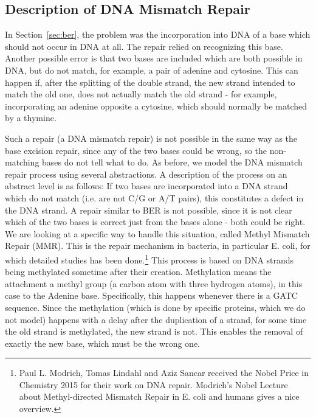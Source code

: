 
\subsection{Description of DNA Mismatch Repair}

In Section~\ref{sec:ber}, the problem was the incorporation into DNA of a base which should not occur in DNA at all. The repair relied on recognizing this base. Another possible error is that two bases are included which are both possible in DNA, but do not match, for example, a pair of adenine and cytosine. This can happen if, after the splitting of the double strand, the new strand intended to match the old one, does not actually match the old strand - for example, incorporating an adenine opposite a cytosine, which should normally be matched by a thymine.

Such a repair (a DNA mismatch repair) is not possible in the same way as the base excision repair, since any of the two bases could be wrong, so the non-matching  bases do not tell what to do. As before, we model the DNA mismatch repair process using several abstractions. A description of the process on an abstract level is as follows: If two bases are incorporated into a DNA strand which do not match (i.e. are not C/G or A/T pairs), this constitutes a defect in the DNA strand. A repair similar to BER is not possible, since it is not clear which of the two bases is correct just from the bases alone - both could be right. We are looking at a specific way to handle this situation, called Methyl Mismatch Repair (MMR). This is the repair mechanism in bacteria, in particular E. coli, for which detailed studies has been done.\footnote{Paul L. Modrich, Tomas Lindahl and Aziz Sancar received the Nobel Price in Chemistry 2015 for their work on DNA repair. Modrich's Nobel Lecture about Methyl-directed Mismatch Repair in E. coli and humans \cite{pmid27198632} gives a nice overview.} This process is based on DNA strands being methylated sometime after their creation. Methylation means the attachment a methyl group (a carbon atom with three hydrogen atoms), in this case to the Adenine base. Specifically, this happens whenever there is a GATC sequence. Since the methylation (which is done by specific proteins, which we do not model) happens with a delay after the duplication of a strand, for some time the old strand is methylated, the new strand is not. This enables the removal of exactly the new base, which must be the wrong one.

